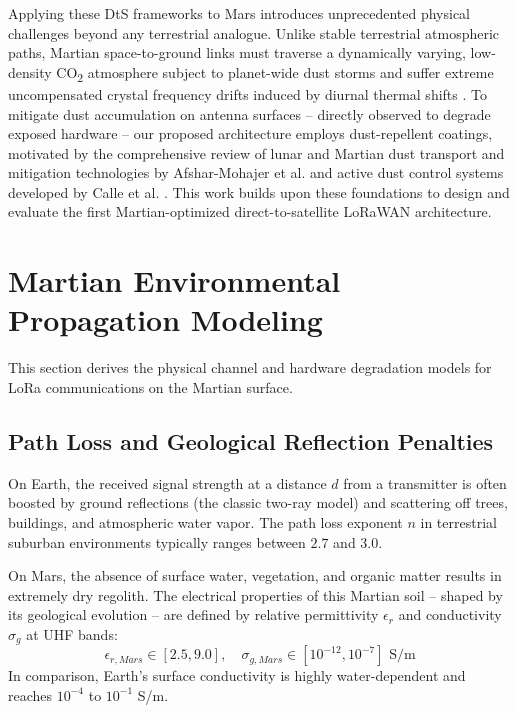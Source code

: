 \documentclass{ijuc}
\begin{document}
Applying these DtS frameworks to Mars introduces unprecedented physical challenges beyond any terrestrial analogue. Unlike stable terrestrial atmospheric paths, Martian space-to-ground links must traverse a dynamically varying, low-density CO\textsubscript{2} atmosphere subject to planet-wide dust storms \cite{haberle1986dust} and suffer extreme uncompensated crystal frequency drifts induced by diurnal thermal shifts \cite{bor2016lora}. To mitigate dust accumulation on antenna surfaces -- directly observed to degrade exposed hardware \cite{landis2000dust} -- our proposed architecture employs dust-repellent coatings, motivated by the comprehensive review of lunar and Martian dust transport and mitigation technologies by Afshar-Mohajer et al. \cite{afshar2015review} and active dust control systems developed by Calle et al. \cite{calle2011active}. This work builds upon these foundations to design and evaluate the first Martian-optimized direct-to-satellite LoRaWAN architecture.

\section{Martian Environmental Propagation Modeling}
\label{sec:modeling}
This section derives the physical channel and hardware degradation models for LoRa communications on the Martian surface.

\subsection{Path Loss and Geological Reflection Penalties}
On Earth, the received signal strength at a distance $d$ from a transmitter is often boosted by ground reflections (the classic two-ray model) and scattering off trees, buildings, and atmospheric water vapor. The path loss exponent $n$ in terrestrial suburban environments typically ranges between $2.7$ and $3.0$. 

On Mars, the absence of surface water, vegetation, and organic matter results in extremely dry regolith. The electrical properties of this Martian soil -- shaped by its geological evolution \cite{carr2010mars} -- are defined by relative permittivity $\epsilon_r$ and conductivity $\sigma_{g}$ at UHF bands:
\begin{equation}
    \epsilon_{r, Mars} \in [2.5, 9.0], \quad \sigma_{g, Mars} \in [10^{-12}, 10^{-7}] \text{ S/m}
\end{equation}
In comparison, Earth's surface conductivity is highly water-dependent and reaches $10^{-4}$ to $10^{-1}$ S/m. 
\end{document}
